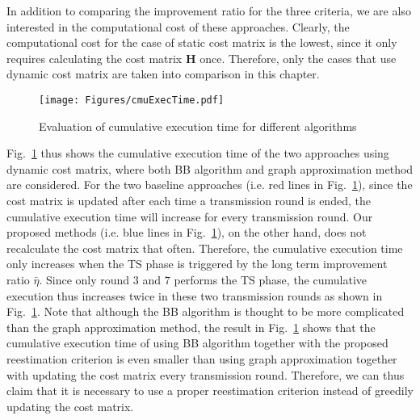 In addition to comparing the improvement ratio for the three criteria, we are also interested in the computational cost of these approaches.
Clearly, the computational cost for the case of static cost matrix is the lowest, since it only requires calculating the cost matrix $\mathbf{H}$ once.
Therefore, only the cases that use dynamic cost matrix are taken into comparison in this chapter.
%
\begin{figure}
\begin{center}
\texttt{[image: Figures/cmuExecTime.pdf]}
\caption{\label{fig::evaExecTime}Evaluation of cumulative execution time for different algorithms}
\end{center}
\end{figure}
%
Fig.~\ref{fig::evaExecTime} thus shows the cumulative execution time of the two approaches using dynamic cost matrix, where both BB algorithm and graph approximation method are considered.
For the two baseline approaches (i.e. red lines in Fig.~\ref{fig::evaExecTime}), since the cost matrix is updated after each time a transmission round is ended, the cumulative execution time will increase for every transmission round.
Our proposed methods (i.e. blue lines in Fig.~\ref{fig::evaExecTime}), on the other hand, does not recalculate the cost matrix that often.
Therefore, the cumulative execution time only increases when the TS phase is triggered by the long term improvement ratio $\bar{\eta}$.
Since only round $3$ and $7$ performs the TS phase, the cumulative execution thus increases twice in these two transmission rounds as shown in Fig.~\ref{fig::evaExecTime}.
Note that although the BB algorithm is thought to be more complicated than the graph approximation method, the result in Fig.~\ref{fig::evaExecTime} shows that the cumulative execution time of using BB algorithm together with the proposed reestimation criterion is even smaller than using graph approximation together with updating the cost matrix every transmission round.
Therefore, we can thus claim that it is necessary to use a proper reestimation criterion instead of greedily updating the cost matrix.

